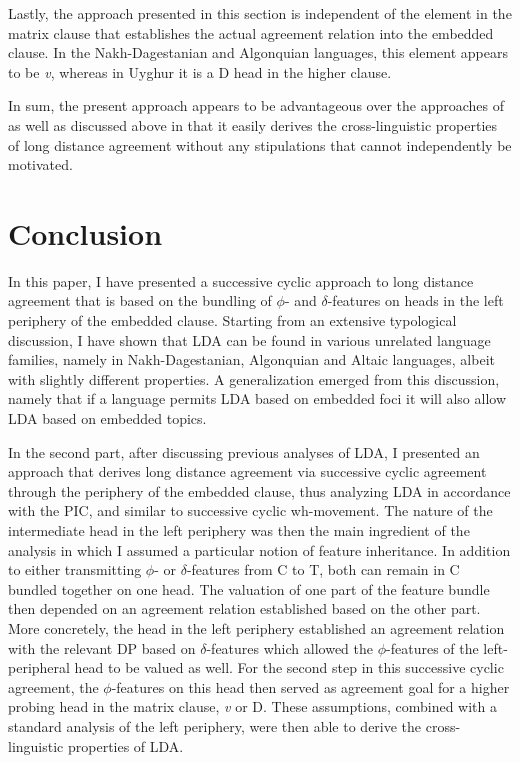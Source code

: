 \documentclass[output=paper
,modfonts
,nonflat]{langsci/langscibook}
\begin{document}
Lastly, the approach presented in this section is independent of the element in the matrix clause that establishes the actual agreement relation into the embedded clause. In the Nakh-Dagestanian and Algonquian languages, this element appears to be \textit{v}, whereas in Uyghur it is a D head in the higher clause.

In sum, the present approach appears to be advantageous over the approaches of \citet{Polinsky_Potsdam2001} as well as \citet{Bjorkman_Zeijlstra2014} discussed above in that it easily derives the cross-linguistic properties of long distance agreement without any stipulations that cannot independently be motivated.

\section{Conclusion}
\label{ch:5}

In this paper, I have presented a successive cyclic approach to long distance agreement that is based on the bundling of $ \phi $- and $ \delta $-features on heads in the left periphery of the embedded clause. Starting from an extensive typological discussion, I have shown that LDA can be found in various unrelated language families, namely in Nakh-Dagestanian, Algonquian and Altaic languages, albeit with slightly different properties. A generalization emerged from this discussion, namely that if a language permits LDA based on embedded foci it will also allow LDA based on embedded topics.

In the second part, after discussing previous analyses of LDA, I presented an approach that derives long distance agreement via successive cyclic agreement through the periphery of the embedded clause, thus analyzing LDA in accordance with the PIC, and similar to successive cyclic wh-movement. The nature of the intermediate head in the left periphery was then the main ingredient of the analysis in which I assumed a particular notion of feature inheritance. In addition to either transmitting $ \phi $- or $ \delta $-features from C to T, both can remain in C bundled together on one head. The valuation of one part of the feature bundle then depended on an agreement relation established based on the other part. More concretely, the head in the left periphery established an agreement relation with the relevant DP based on $ \delta $-features which allowed the $ \phi $-features of the left-peripheral head to be valued as well. For the second step in this successive cyclic agreement, the $ \phi $-features on this head then served as agreement goal for a higher probing head in the matrix clause, \textit{v} or D. These assumptions, combined with a standard analysis of the left periphery, were then able to derive the cross-linguistic properties of LDA.
\end{document}
